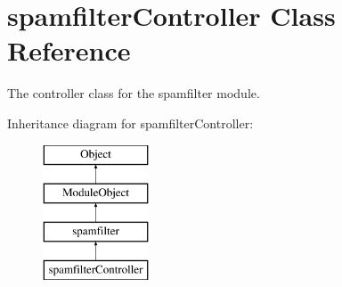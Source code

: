 \hypertarget{classspamfilterController}{\section{spamfilter\+Controller Class Reference}
\label{classspamfilterController}
}


The controller class for the spamfilter module.  


Inheritance diagram for spamfilter\+Controller\+:\begin{figure}[H]
\begin{center}
\leavevmode
\includegraphics[height=4.000000cm]{classspamfilterController}
\end{center}
\end{figure}

